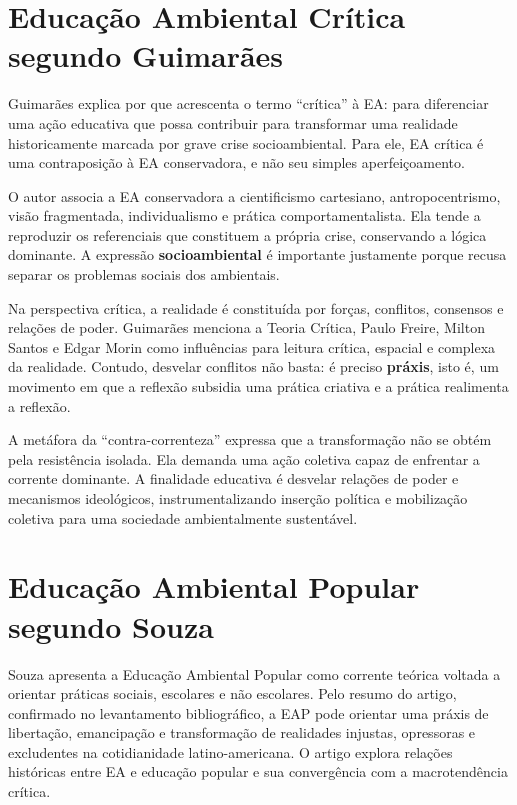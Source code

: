 \documentclass[12pt,a4paper]{article}
\begin{document}
\section{Educação Ambiental Crítica segundo Guimarães}

Guimarães explica por que acrescenta o termo ``crítica'' à EA: para diferenciar uma ação educativa que possa contribuir para transformar uma realidade historicamente marcada por grave crise socioambiental. Para ele, EA crítica é uma contraposição à EA conservadora, e não seu simples aperfeiçoamento.

O autor associa a EA conservadora a cientificismo cartesiano, antropocentrismo, visão fragmentada, individualismo e prática comportamentalista. Ela tende a reproduzir os referenciais que constituem a própria crise, conservando a lógica dominante. A expressão \textbf{socioambiental} é importante justamente porque recusa separar os problemas sociais dos ambientais.

Na perspectiva crítica, a realidade é constituída por forças, conflitos, consensos e relações de poder. Guimarães menciona a Teoria Crítica, Paulo Freire, Milton Santos e Edgar Morin como influências para leitura crítica, espacial e complexa da realidade. Contudo, desvelar conflitos não basta: é preciso \textbf{práxis}, isto é, um movimento em que a reflexão subsidia uma prática criativa e a prática realimenta a reflexão.

A metáfora da ``contra-correnteza'' expressa que a transformação não se obtém pela resistência isolada. Ela demanda uma ação coletiva capaz de enfrentar a corrente dominante. A finalidade educativa é desvelar relações de poder e mecanismos ideológicos, instrumentalizando inserção política e mobilização coletiva para uma sociedade ambientalmente sustentável.

\section{Educação Ambiental Popular segundo Souza}

Souza apresenta a Educação Ambiental Popular como corrente teórica voltada a orientar práticas sociais, escolares e não escolares. Pelo resumo do artigo, confirmado no levantamento bibliográfico, a EAP pode orientar uma práxis de libertação, emancipação e transformação de realidades injustas, opressoras e excludentes na cotidianidade latino-americana. O artigo explora relações históricas entre EA e educação popular e sua convergência com a macrotendência crítica.
\end{document}
